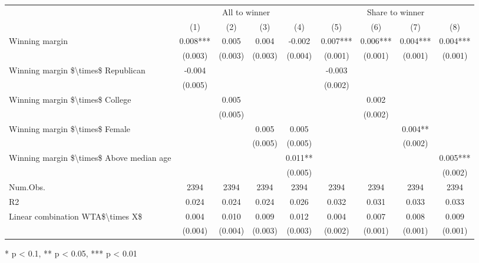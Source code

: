 \begin{table}[t]
\fontsize{12.0pt}{14.4pt}\selectfont
\begin{tabular*}{\linewidth}{@{\extracolsep{\fill}}lcccccccc}
\toprule
 & \multicolumn{4}{c}{All to winner} & \multicolumn{4}{c}{Share to winner} \\ 
\cmidrule(lr){2-5} \cmidrule(lr){6-9}
  & (1) & (2) & (3) & (4) & (5) & (6) & (7) & (8) \\ 
\midrule\addlinespace[2.5pt]
Winning margin & 0.008*** & 0.005 & 0.004 & -0.002 & 0.007*** & 0.006*** & 0.004*** & 0.004*** \\ 
 & (0.003) & (0.003) & (0.003) & (0.004) & (0.001) & (0.001) & (0.001) & (0.001) \\ 
Winning margin \$\textbackslash{}times\$ Republican & -0.004 &  &  &  & -0.003 &  &  &  \\ 
 & (0.005) &  &  &  & (0.002) &  &  &  \\ 
Winning margin \$\textbackslash{}times\$ College &  & 0.005 &  &  &  & 0.002 &  &  \\ 
 &  & (0.005) &  &  &  & (0.002) &  &  \\ 
Winning margin \$\textbackslash{}times\$ Female &  &  & 0.005 & 0.005 &  &  & 0.004** &  \\ 
 &  &  & (0.005) & (0.005) &  &  & (0.002) &  \\ 
Winning margin \$\textbackslash{}times\$ Above median age &  &  &  & 0.011** &  &  &  & 0.005*** \\ 
{} & {} & {} & {} & {(0.005)} & {} & {} & {} & {(0.002)} \\ 
Num.Obs. & 2394 & 2394 & 2394 & 2394 & 2394 & 2394 & 2394 & 2394 \\ 
R2 & 0.024 & 0.024 & 0.024 & 0.026 & 0.032 & 0.031 & 0.033 & 0.033 \\ 
Linear combination WTA\$\textbackslash{}times X\$ & 0.004 & 0.010 & 0.009 & 0.012 & 0.004 & 0.007 & 0.008 & 0.009 \\ 
 & (0.004) & (0.004) & (0.003) & (0.003) & (0.002) & (0.001) & (0.001) & (0.001) \\ 
\bottomrule
\end{tabular*}
\begin{minipage}{\linewidth}
* p < 0.1, ** p < 0.05, *** p < 0.01\\
\end{minipage}
\end{table}

